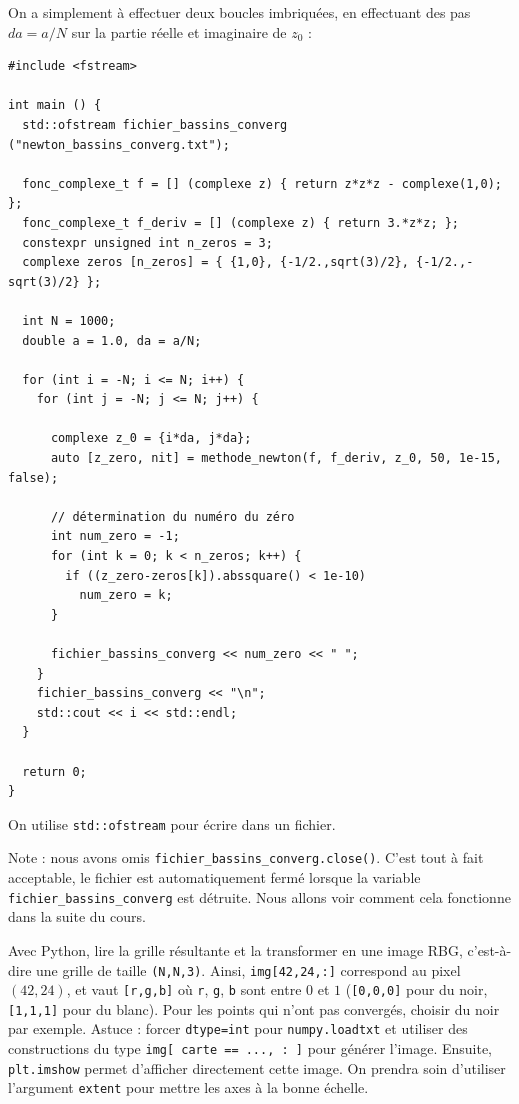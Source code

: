 \documentclass{book}
\newcommand{\inline}[1]{\texttt{#1}}
\begin{document}
\begin{correction}
On a simplement à effectuer deux boucles imbriquées, en effectuant des pas $da=a/N$ sur la partie réelle et imaginaire de $z_0$ :
\begin{verbatim}
#include <fstream>

int main () {
  std::ofstream fichier_bassins_converg ("newton_bassins_converg.txt");

  fonc_complexe_t f = [] (complexe z) { return z*z*z - complexe(1,0); };
  fonc_complexe_t f_deriv = [] (complexe z) { return 3.*z*z; };
  constexpr unsigned int n_zeros = 3;
  complexe zeros [n_zeros] = { {1,0}, {-1/2.,sqrt(3)/2}, {-1/2.,-sqrt(3)/2} };

  int N = 1000;
  double a = 1.0, da = a/N;

  for (int i = -N; i <= N; i++) {
    for (int j = -N; j <= N; j++) {

      complexe z_0 = {i*da, j*da};
      auto [z_zero, nit] = methode_newton(f, f_deriv, z_0, 50, 1e-15, false);

      // détermination du numéro du zéro
      int num_zero = -1;
      for (int k = 0; k < n_zeros; k++) {
        if ((z_zero-zeros[k]).abssquare() < 1e-10)
          num_zero = k;
      }

      fichier_bassins_converg << num_zero << " ";
    }
    fichier_bassins_converg << "\n";
    std::cout << i << std::endl;
  }

  return 0;
}
\end{verbatim}

On utilise \inline{std::ofstream} pour écrire dans un fichier.

Note : nous avons omis \inline{fichier_bassins_converg.close()}. C'est tout à fait acceptable, le fichier est automatiquement fermé lorsque la variable \inline{fichier_bassins_converg} est détruite. Nous allons voir comment cela fonctionne dans la suite du cours.

\end{correction}

Avec Python, lire la grille résultante et la transformer en une image RBG, c'est-à-dire une grille de taille \inline{(N,N,3)}. Ainsi, \inline{img[42,24,:]} correspond au pixel $(42,24)$, et vaut \inline{[r,g,b]} où \texttt{r}, \texttt{g}, \texttt{b} sont entre $0$ et $1$ (\inline{[0,0,0]} pour du noir, \inline{[1,1,1]} pour du blanc). Pour les points qui n'ont pas convergés, choisir du noir par exemple. Astuce : forcer \texttt{dtype=int} pour \texttt{numpy.loadtxt} et utiliser des constructions du type \inline{img[ carte == ..., : ]} pour générer l'image. Ensuite, \inline{plt.imshow} permet d'afficher directement cette image. On prendra soin d'utiliser l'argument \texttt{extent} pour mettre les axes à la bonne échelle.\\
\end{document}
